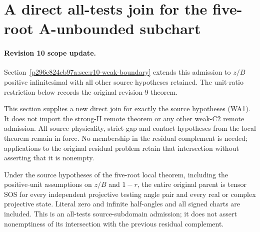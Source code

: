 \section{\texorpdfstring{A direct all-tests join for the five-root A-unbounded subchart}{A direct all-tests join for the five-root A-unbounded subchart}}
\label{component:p0d4eedd6c7a4}

\label{p0d4eedd6c7a4:sec:r9-weak-A-remote}

\paragraph{Revision 10 scope update.}
Section~\ref{p296e824cb97a:sec:r10-weak-boundary} extends this admission to $z/B$
positive infinitesimal with all other source hypotheses retained.
The unit-ratio restriction below records the original revision-9 theorem.

This section supplies a new direct join for exactly the source
hypotheses (WA1). It does not import the strong-II remote theorem
or any other weak-C2 remote admission. All source physicality,
strict-gap and contact hypotheses from the local theorem remain
in force. No membership in the residual complement is needed;
applications to the original residual problem retain that intersection
without asserting that it is nonempty.

\begin{theorem}
Under the source hypotheses of the five-root local theorem, including
the positive-unit assumptions on $z/B$ and $1-r$, the entire original
parent is tensor SOS for every independent projective testing angle
pair and every real or complex projective state. Literal zero and
infinite half-angles and all signed charts are included.
This is an all-tests source-subdomain admission; it does not assert
nonemptiness of its intersection with the previous residual complement.
\end{theorem}

